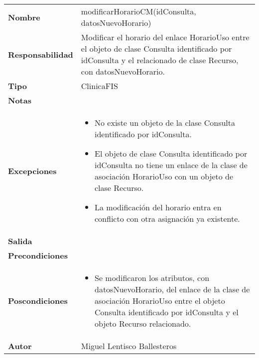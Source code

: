 \documentclass[11pt,a4paper]{article}
\newenvironment{itemizenomargins}
    {\begin{minipage}[t]{1\linewidth}\begin{itemize}}
    {\end{itemize}\end{minipage}}
\begin{document}
\begin{table}[H]
	\centering
	\label{my-label}
	\begin{tabularx}{\textwidth}{l|X}
		\textbf{Nombre}          & modificarHorarioCM(idConsulta, datosNuevoHorario) \\
		\textbf{Responsabilidad} & Modificar el horario del enlace HorarioUso entre el objeto de clase Consulta identificado por idConsulta y el relacionado de clase Recurso, con datosNuevoHorario. \\
		\textbf{Tipo}            & ClinicaFIS \\
		\textbf{Notas}           &  \\
		\textbf{Excepciones}     &  
			\begin{itemizenomargins}
				\item No existe un objeto de la clase Consulta identificado por idConsulta.
				\item El objeto de clase Consulta identificado por idConsulta no tiene un enlace de la clase de asociación HorarioUso con un objeto de clase Recurso. 
				\item La modificación del horario entra en conflicto con otra asignación ya existente.
			\end{itemizenomargins}		\\
		\textbf{Salida}          &  \\
		\textbf{Precondiciones}  &  \\
		\textbf{Poscondiciones}  &  
			\begin{itemizenomargins}
				\item Se modificaron los atributos, con datosNuevoHorario, del enlace de la clase de asociación HorarioUso entre el objeto Consulta identificado por idConsulta y el objeto Recurso relacionado.
			\end{itemizenomargins} \\
		\textbf{Autor}			 & Miguel Lentisco Ballesteros
	\end{tabularx}
\end{table}
\end{document}

